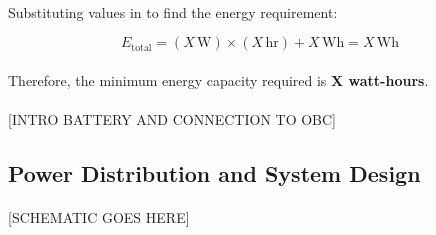 \documentclass[11pt]{article}
\begin{document}
	\paragraph{}Substituting values in to find the energy requirement:
	
	\[
	E_{\text{total}} = (X \, \text{W}) \times (X \, \text{hr}) + X \, \text{Wh} = X \, \text{Wh}
	\]
	
	\paragraph{}Therefore, the minimum energy capacity required is \textbf{X watt-hours}.
	
	\paragraph{}[INTRO BATTERY AND CONNECTION TO OBC]
	
	
	\subsection{Power Distribution and System Design}
	
	\paragraph{}[SCHEMATIC GOES HERE]
	
	
\end{document}
